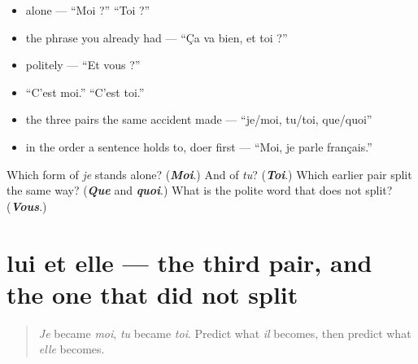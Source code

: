 \begin{itemize}
\raggedright
  \item alone — \textquotedblleft{}Moi ?\textquotedblright{} \textquotedblleft{}Toi ?\textquotedblright{}
  \item the phrase you already had — \textquotedblleft{}Ça va bien, et toi ?\textquotedblright{}
  \item politely — \textquotedblleft{}Et vous ?\textquotedblright{}
  \item \textquotedblleft{}C'est moi.\textquotedblright{} \textquotedblleft{}C'est toi.\textquotedblright{}
  \item the three pairs the same accident made — \textquotedblleft{}je/moi, tu/toi, que/quoi\textquotedblright{}
  \item in the order a sentence holds to, doer first — \textquotedblleft{}Moi, je parle français.\textquotedblright{}
\end{itemize}

\begin{tcolorbox}[breakable,colback=teal!4,colframe=teal!35!black,title={Before you move on}]
Which form of \emph{je} stands alone? (\emph{\textbf{Moi}}.) And of \emph{tu}? (\emph{\textbf{Toi}}.) Which earlier pair split the same way? (\emph{\textbf{Que}} and \emph{\textbf{quoi}}.) What is the polite word that does not split? (\emph{\textbf{Vous}}.)
\end{tcolorbox}
\section[lui et elle]{lui et elle — the third pair, and the one that did not split}

\label{lesson:FR-C39-lui-elle}



\begin{quote}
\emph{Je} became \emph{moi}, \emph{tu} became \emph{toi}. Predict what \emph{il} becomes, then predict what \emph{elle} becomes.
\end{quote}

